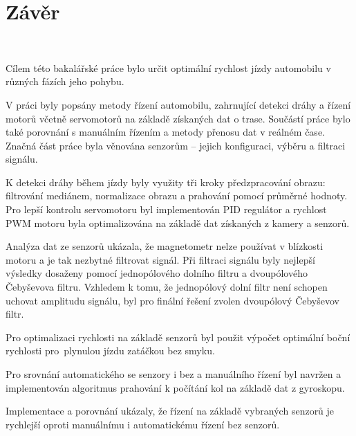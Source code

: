 \chapter{Závěr}
\label{sec:End}
\

Cílem této bakalářské práce bylo určit optimální rychlost jízdy automobilu v různých
fázích jeho pohybu.

V práci byly popsány metody řízení automobilu, zahrnující detekci dráhy a řízení
motorů včetně servomotorů na základě získaných dat o trase. Součástí práce bylo také
porovnání s manuálním řízením a metody přenosu dat v reálném čase. Značná část práce
byla věnována senzorům – jejich konfiguraci, výběru a filtraci signálu.

K detekci dráhy během jízdy byly využity tři kroky předzpracování obrazu: filtrování
mediánem, normalizace obrazu a prahování pomocí průměrné hodnoty. Pro lepší kontrolu
servomotoru byl implementován PID regulátor a rychlost PWM motoru byla optimalizována
na základě dat získaných z kamery a senzorů.

Analýza dat ze senzorů ukázala, že magnetometr nelze používat v blízkosti motoru a je
tak nezbytné filtrovat signál. Při filtraci signálu byly nejlepší výsledky dosaženy
pomocí jednopólového dolního filtru a dvoupólového Čebyševova filtru. Vzhledem k tomu,
že jednopólový dolní filtr není schopen uchovat amplitudu signálu, byl pro finální
řešení zvolen dvoupólový Čebyševov filtr.

Pro optimalizaci rychlosti na základě senzorů byl použit výpočet optimální boční
rychlosti pro~plynulou jízdu zatáčkou bez smyku.

Pro srovnání automatického se senzory i bez a manuálního řízení byl navržen a implementován algoritmus
prahování k počítání kol na základě dat z gyroskopu.

Implementace a porovnání ukázaly, že řízení na základě vybraných senzorů je rychlejší
oproti manuálnímu i automatickému řízení bez senzorů.

\endinput
